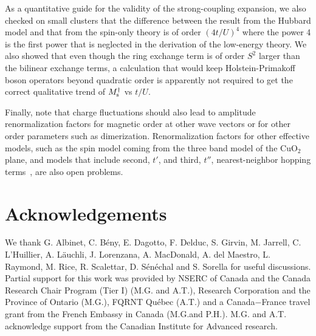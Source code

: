 \documentclass[aps,prb,twocolumn,superscriptaddress,
               amsmath]{revtex4}
\renewcommand{\=}{\,=\,}
\newcommand{\+}{\,+\,}
\renewcommand{\-}{\,-\,}
\begin{document}
As a quantitative guide for the validity of the strong-coupling expansion, 
we also checked on small clusters that the difference between 
the result from the Hubbard model and that 
from the spin-only theory is of order $(4t/U)^4$ where the power 
4 is the first power
that is neglected in the derivation of the low-energy theory. 
We also showed that even though the ring exchange term is
of order $S^2$ larger than the bilinear
exchange terms, a calculation that would keep Holstein-Primakoff 
boson operators beyond
quadratic order is apparently not required to get the correct qualitative
trend of $M_{\rm s}^\dagger$ vs $t/U$.


Finally, note that charge fluctuations should also lead to amplitude
renormalization factors for magnetic order at other wave vectors
or for other order parameters such as dimerization.
Renormalization factors for other effective models, such as the
spin model coming from the three band model of the CuO$_2$ plane,
and models that include second, $t'$, and third, $t''$, nearest-neighbor
hopping terms~\cite{DGHT-2},
are also open problems.





\section{Acknowledgements}


We thank
 G. Albinet,
 C. B\'eny,
 E. Dagotto,
 F. Delduc,
 S. Girvin,
 M. Jarrell,
 C. L'Huillier,
 A. L\"auchli,
 J. Lorenzana,
 A. MacDonald,
 A. del Maestro,
 L. Raymond,
 M. Rice,
 R. Scalettar,
 D. S\'en\'echal and
 S. Sorella for useful
discussions. Partial support for this work was provided by NSERC
of Canada and the Canada Research Chair Program (Tier I) (M.G. and
A.T.), Research Corporation and the Province of Ontario (M.G.),
FQRNT Qu\'ebec (A.T.) and a Canada$-$France travel grant from the
French Embassy in Canada (M.G.and P.H.). M.G. and A.T. acknowledge
support from the Canadian Institute for Advanced research.




\appendix
\end{document}
